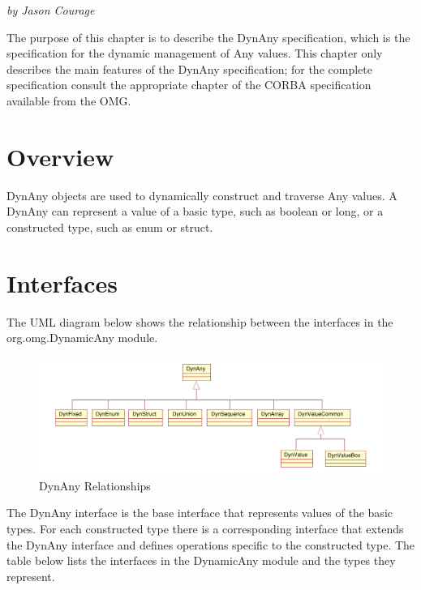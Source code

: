 {\em by Jason Courage}

The purpose of this chapter is to describe the DynAny specification,
which is the specification for the dynamic management of Any values.
This chapter only describes the main features of the DynAny
specification; for the complete specification consult the appropriate
chapter of the CORBA specification available from the OMG.

\section{Overview}

DynAny objects are used to dynamically construct and traverse Any
values.  A DynAny can represent a value of a basic type, such as
boolean or long, or a constructed type, such as enum or struct.

\section{Interfaces}

The UML diagram below shows the relationship between the interfaces
in the org.omg.DynamicAny module.

\smallskip
\begin{figure}[htb]
  \begin{center}
    \includegraphics[width=\textwidth]{DynAny/dynany}
  \end{center}
\caption{DynAny Relationships}
\end{figure}


The DynAny interface is the base interface that represents values of
the basic types.  For each constructed type there is a corresponding
interface that extends the DynAny interface and defines operations
specific to the constructed type.  The table below lists the
interfaces in the DynamicAny module and the types they represent.


